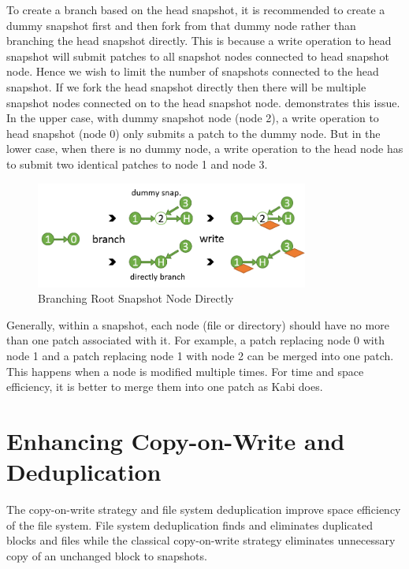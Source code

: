     To create a branch based on the head snapshot, it is recommended to create a dummy snapshot first and then fork from that dummy node rather than branching the head snapshot directly. This is because a write operation to head snapshot will submit patches to all snapshot nodes connected to head snapshot node. Hence we wish to limit the number of snapshots connected to the head snapshot. If we fork the head snapshot directly then there will be multiple snapshot nodes connected on to the head snapshot node.  demonstrates this issue. In the upper case, with dummy snapshot node (node 2), a write operation to head snapshot (node 0) only submits a patch to the dummy node. But in the lower case, when there is no dummy node, a write operation to the head node has to submit two identical patches to node 1 and node 3.

\begin{figure}[t]
\centering
\includegraphics[width=0.8\textwidth]{Chapter-4/figs/fig16.png}
\caption{Branching Root Snapshot Node Directly}
\label{fig:dummy_node}
\end{figure}

	Generally, within a snapshot, each node (file or directory) should have no more than one patch associated with it. For example, a patch replacing node 0 with node 1 and a patch replacing node 1 with node 2 can be merged into one patch. This happens when a node is modified multiple times. For time and space efficiency, it is better to merge them into one patch as Kabi does.
	
\section{Enhancing Copy-on-Write and Deduplication}

	The copy-on-write strategy and file system deduplication improve space efficiency of the file system. File system deduplication finds and eliminates duplicated blocks and files while the classical copy-on-write strategy eliminates unnecessary copy of an unchanged block to snapshots.

